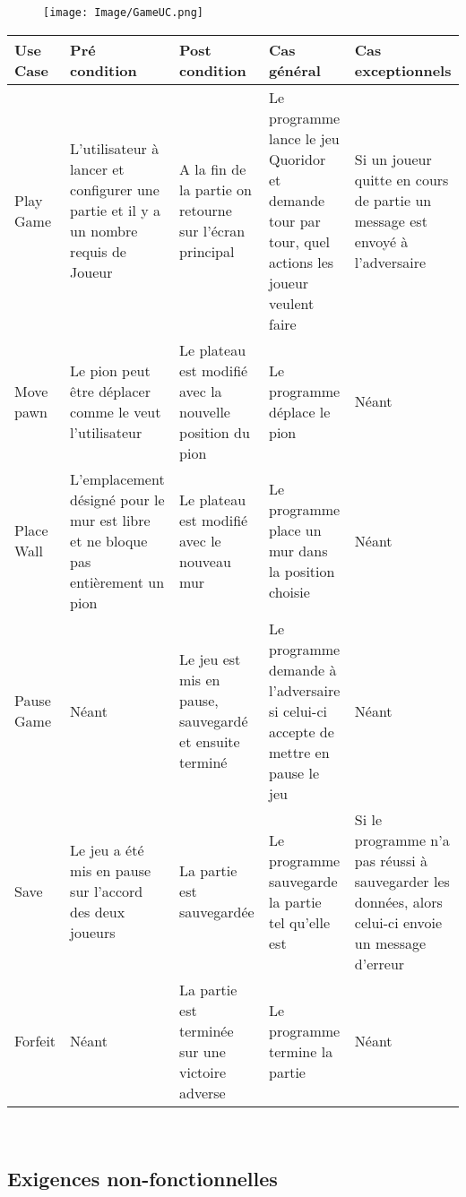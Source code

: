\documentclass[french, utf8]{article}
\begin{document}
\begin{figure}[ht]
     \centering
    \texttt{[image: Image/GameUC.png]}

\end{figure}
\begin{center}
\begin{tabular}{|m{3cm}|m{3cm}|m{3cm}|m{3cm}|m{3cm}|}
\hline  Use Case & Pré condition      &  Post condition  & Cas général & Cas exceptionnels\\
\hline Play Game& L'utilisateur à lancer et configurer une partie et il y a un nombre requis de Joueur & A la fin de la partie on retourne sur l'écran principal & Le programme lance le jeu Quoridor et demande tour par tour, quel actions les joueur veulent faire & Si un joueur quitte en cours de partie un message est envoyé à l'adversaire  \\
\hline Move pawn  & Le pion peut être déplacer comme le veut l'utilisateur & Le plateau est modifié avec la nouvelle position du pion & Le programme déplace le pion & Néant \\
\hline Place Wall  & L'emplacement désigné pour le mur est libre et ne bloque pas entièrement un pion & Le plateau est modifié avec le nouveau mur & Le programme place un mur dans la position choisie & Néant \\
\hline Pause Game  & Néant & Le jeu est mis en pause, sauvegardé et ensuite terminé & Le programme demande à l'adversaire si celui-ci accepte de mettre en pause le jeu & Néant \\
\hline Save  & Le jeu a été mis en pause sur l'accord des deux joueurs & La partie est sauvegardée & Le programme sauvegarde la partie tel qu'elle est & Si le programme n'a pas réussi à sauvegarder les données, alors celui-ci envoie un message d'erreur \\
\hline Forfeit  & Néant & La partie est terminée sur une victoire adverse & Le programme termine la partie & Néant \\
\hline
\end{tabular}\\
\end{center}

\newpage
\subsection{Exigences non-fonctionnelles}
\end{document}
